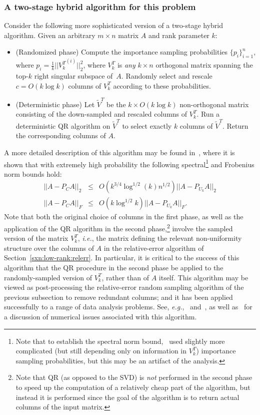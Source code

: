 \documentclass[twoside]{article}
\begin{document}
\subsubsection{A two-stage hybrid algorithm for this problem}

Consider the following more sophisticated version of a two-stage hybrid 
algorithm.
Given an arbitrary $m \times n$ matrix $A$ and rank parameter $k$:
\begin{itemize}
\item
(Randomized phase)
Compute the importance sampling probabilities $\{p_i\}_{i=1}^{n}$, where 
$p_i=\frac{1}{k}||{V_k^T}^{(i)}||_2^2$, where $V_k^T$ is \emph{any} 
$k \times n$ orthogonal matrix spanning the top-$k$ right singular subspace 
of~$A$.
Randomly select and rescale $c = O(k \log k)$ columns of $V_k^T$ according 
to these probabilities.
\item
(Deterministic phase)
Let $\tilde{V}^T$ be the $k \times O(k \log k)$ non-orthogonal matrix 
consisting of the down-sampled and rescaled columns of $V_k^T$.
Run a deterministic QR algorithm on $\tilde{V}^T$ to select exactly $k$ 
columns of $\tilde{V}^T$.
Return the corresponding columns of $A$.
\end{itemize}
A more detailed description of this algorithm may be found 
in~\cite{BMD09_CSSP_SODA,BMD08_CSSP_TRv2}, where it is shown that with 
extremely high probability the following spectral\footnote{Note that to establish the spectral norm 
bound,~\cite{BMD09_CSSP_SODA,BMD08_CSSP_TRv2} used slightly more complicated 
(but still depending only on information in $V_k^T$) importance sampling 
probabilities, but this may be an artifact of the analysis.}
and Frobenius norm bounds hold:
\begin{eqnarray}
\label{eqn:cssp-4}
||A-P_CA||_2 &\le& O(k^{3/4} \log^{1/2}(k) n^{1/2}) ||A-P_{U_k}A||_2  \\
\label{eqn:cssp-5}
||A-P_CA||_F &\le& O(k \log^{1/2} k) ||A-P_{U_k}A||_F   .
\end{eqnarray}
Note that both the original choice of columns in the first phase, as well 
as the application of the QR algorithm in the second phase,\footnote{Note that QR (as opposed to the SVD) is \emph{not} performed in 
the second phase to speed up the computation of a relatively cheap part of 
the algorithm, but instead it is performed since the goal of the algorithm 
is to return actual columns of the input matrix.}
involve the sampled version of the matrix $V_k^T$, \emph{i.e.}, the matrix defining the relevant 
non-uniformity structure over the columns of $A$ in the relative-error 
algorithm of Section~\ref{sxn:low-rank:relerr}.
In particular, it is critical to the success of this algorithm that the QR 
procedure in the second phase be applied to the randomly-sampled version 
of $V_k^T$, rather than of $A$ itself.
This algorithm may be viewed as post-processing the relative-error 
random sampling algorithm of the previous subsection to remove redundant 
columns; and it has been applied successfully to a range of data analysis 
problems.  See, \emph{e.g.},~\cite{Paschou08a,Paschou10a,Paschou10b}
and~\cite{BMD08_CSSP_KDD,BMD09_kmeans_NIPS,SD11}, as well as~\cite{BBP10}
for a discussion of numerical issues associated with this algorithm.
\end{document}

